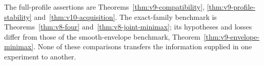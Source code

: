 The full-profile assertions are Theorems~\ref{thm:v9-compatibility},
\ref{thm:v9-profile-stability} and~\ref{thm:v10-acquisition}.
The exact-family benchmark is Theorems~\ref{thm:v8-four}
and~\ref{thm:v8-joint-minimax}; its hypotheses and losses differ from
those of the smooth-envelope benchmark,
Theorem~\ref{thm:v9-envelope-minimax}. None of these comparisons
transfers the information supplied in one experiment to another.
